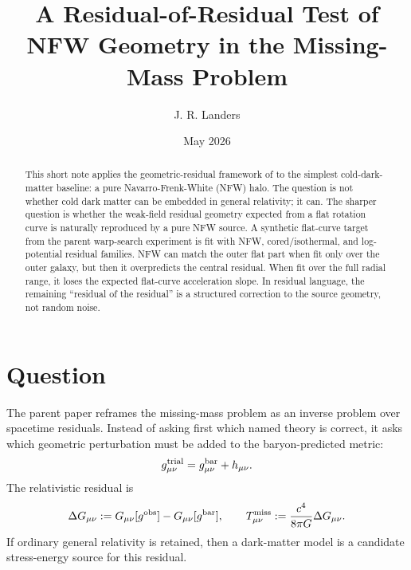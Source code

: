 \documentclass[10pt]{article}
\title{A Residual-of-Residual Test of NFW Geometry in the Missing-Mass Problem}
\author{J. R. Landers}
\date{\vspace{-0.6em}May 2026}
\newcommand{\Gobs}{G_{\mu\nu}[g^{\rm obs}]}
\newcommand{\Gbar}{G_{\mu\nu}[g^{\rm bar}]}
\newcommand{\Tmiss}{T^{\rm miss}_{\mu\nu}}
\begin{document}
\maketitle
\vspace{-1.8em}

\begin{abstract}
This short note applies the geometric-residual framework of
\citet{Landers2026Residuals} to the simplest cold-dark-matter baseline: a
pure Navarro-Frenk-White (NFW) halo. The question is not whether cold dark
matter can be embedded in general relativity; it can. The sharper question is
whether the weak-field residual geometry expected from a flat rotation curve is
naturally reproduced by a pure NFW source. A synthetic flat-curve target from
the parent warp-search experiment is fit with NFW, cored/isothermal, and
log-potential residual families. NFW can match the outer flat part when fit
only over the outer galaxy, but then it overpredicts the central residual. When
fit over the full radial range, it loses the expected flat-curve acceleration
slope. In residual language, the remaining ``residual of the residual'' is a
structured correction to the source geometry, not random noise.
\end{abstract}

\section{Question}

The parent paper \citep{Landers2026Residuals} reframes the missing-mass problem
as an inverse problem over spacetime residuals. Instead of asking first which
named theory is correct, it asks which geometric perturbation must be added to
the baryon-predicted metric:
\begin{equation}
g_{\mu\nu}^{\rm trial}
=
g_{\mu\nu}^{\rm bar}
+
h_{\mu\nu}.
\end{equation}
The relativistic residual is
\begin{equation}
\Delta G_{\mu\nu}
:=
\Gobs-\Gbar,
\qquad
\Tmiss
:=
\frac{c^4}{8\pi G}\Delta G_{\mu\nu}.
\end{equation}
If ordinary general relativity is retained, then a dark-matter model is a
candidate stress-energy source for this residual.
\end{document}

